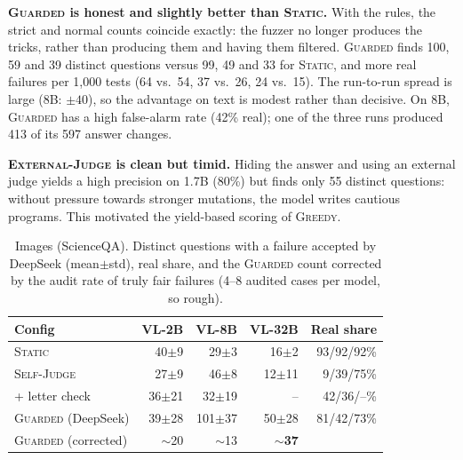 \documentclass[sigconf]{acmart}
\newcommand{\HW}{\textsc{Static}}
\newcommand{\SJ}{\textsc{Self-Judge}}
\newcommand{\OJ}{\textsc{External-Judge}}
\newcommand{\BOLD}{\textsc{Greedy}}
\newcommand{\BR}{\textsc{Guarded}}
\newcommand{\pmstd}[1]{{\scriptsize$\pm$#1}}
\begin{document}
\textbf{\BR{} is honest and slightly better than \HW{}.} With the rules, the strict and normal counts coincide
exactly: the fuzzer no longer produces the tricks, rather than producing them and having them filtered. \BR{} finds 100,
59 and 39 distinct questions versus 99, 49 and 33 for \HW{}, and more real failures per 1{,}000 tests (64 vs.\ 54, 37
vs.\ 26, 24 vs.\ 15). The run-to-run spread is large (8B: $\pm40$), so the advantage on text is modest rather than
decisive. On 8B, \BR{} has a high false-alarm rate (42\% real); one of the three runs produced 413 of its 597 answer
changes.



\textbf{\OJ{} is clean but timid.} Hiding the answer and using an external judge yields a high precision on
1.7B (80\%) but finds only 55 distinct questions: without pressure towards stronger mutations, the model writes cautious
programs. This motivated the yield-based scoring of \BOLD{}.

\begin{table}[t]
\centering
\caption{Images (ScienceQA). Distinct questions with a failure accepted by DeepSeek (mean$\pm$std), real share, and the
\BR{} count corrected by the audit rate of truly fair failures (4--8 audited cases per model, so rough).}
\label{tab:img}
\small
\setlength{\tabcolsep}{3pt}
\begin{tabular}{@{}lrrrr@{}}
\toprule
Config & VL-2B & VL-8B & VL-32B & Real share \\
\midrule
\HW{}                & 40\pmstd{9}  & 29\pmstd{3}   & 16\pmstd{2}  & 93/92/92\% \\
\SJ{}                & 27\pmstd{9}  & 46\pmstd{8}   & 12\pmstd{11} & 9/39/75\% \\
\quad + letter check & 36\pmstd{21} & 32\pmstd{19}  & --           & 42/36/--\% \\
\BR{} (DeepSeek)     & 39\pmstd{28} & 101\pmstd{37} & 50\pmstd{28} & 81/42/73\% \\
\BR{} (corrected)    & $\sim$20 & $\sim$13 & \textbf{$\sim$37} & \\
\bottomrule
\end{tabular}
\end{table}
\end{document}
